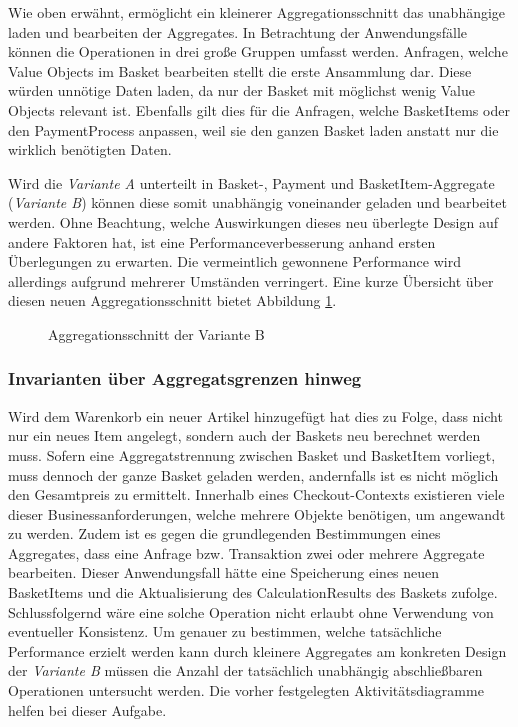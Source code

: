 Wie oben erwähnt, ermöglicht ein kleinerer Aggregationsschnitt das unabhängige laden und bearbeiten der Aggregates. In Betrachtung der Anwendungsfälle können die Operationen in drei große Gruppen umfasst werden. Anfragen, welche Value Objects im Basket bearbeiten stellt die erste Ansammlung dar. Diese würden unnötige Daten laden, da nur der Basket mit möglichst wenig Value Objects relevant ist. Ebenfalls gilt dies für die Anfragen, welche BasketItems oder den PaymentProcess anpassen, weil sie den ganzen Basket laden anstatt nur die wirklich benötigten Daten.

Wird die \emph{Variante A} unterteilt in Basket-, Payment und BasketItem-Aggregate (\emph{Variante B}) können diese somit unabhängig voneinander geladen und bearbeitet werden. Ohne Beachtung, welche Auswirkungen dieses neu überlegte Design auf andere Faktoren hat, ist eine Performanceverbesserung anhand ersten Überlegungen zu erwarten. Die vermeintlich gewonnene Performance wird allerdings aufgrund mehrerer Umständen verringert. Eine kurze Übersicht über diesen neuen Aggregationsschnitt bietet Abbildung \ref{fig:VarB}.

\begin{figure}[htbp]
	\centering
	
	\caption{Aggregationsschnitt der Variante B}
	\label{fig:VarB}
\end{figure}

\subsubsection{Invarianten über Aggregatsgrenzen hinweg}

Wird dem Warenkorb ein neuer Artikel hinzugefügt hat dies zu Folge, dass nicht nur ein neues Item angelegt, sondern auch der Baskets neu berechnet werden muss. Sofern eine Aggregatstrennung zwischen Basket und BasketItem vorliegt, muss dennoch der ganze Basket geladen werden, andernfalls ist es nicht möglich den Gesamtpreis zu ermittelt. Innerhalb eines Checkout-Contexts existieren viele dieser Businessanforderungen, welche mehrere Objekte benötigen, um angewandt zu werden. Zudem ist es gegen die grundlegenden Bestimmungen eines Aggregates, dass eine Anfrage bzw. Transaktion zwei oder mehrere Aggregate bearbeiten. Dieser Anwendungsfall hätte eine Speicherung eines neuen BasketItems und die Aktualisierung des CalculationResults des Baskets zufolge. Schlussfolgernd wäre eine solche Operation nicht erlaubt ohne Verwendung von eventueller Konsistenz. Um genauer zu bestimmen, welche tatsächliche Performance erzielt werden kann durch kleinere Aggregates am konkreten Design der \emph{Variante B} müssen die Anzahl der tatsächlich unabhängig abschließbaren Operationen untersucht werden. Die vorher festgelegten Aktivitätsdiagramme helfen bei dieser Aufgabe.

